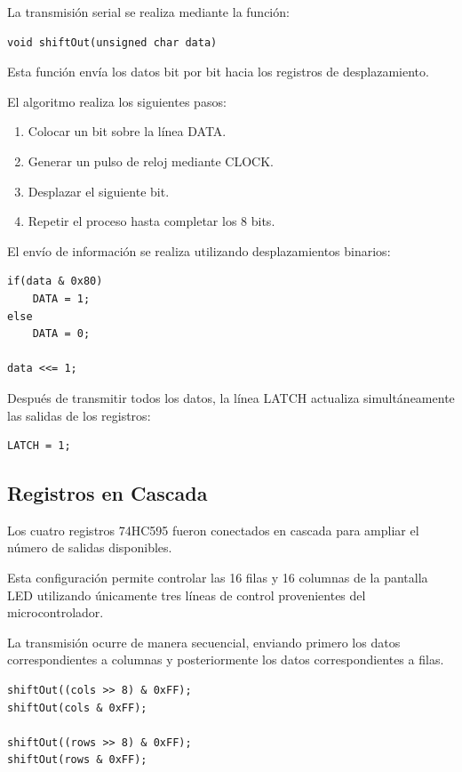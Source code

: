 La transmisión serial se realiza mediante la función:

\begin{verbatim}
void shiftOut(unsigned char data)
\end{verbatim}

Esta función envía los datos bit por bit hacia los registros de desplazamiento.

El algoritmo realiza los siguientes pasos:

\begin{enumerate}
    \item Colocar un bit sobre la línea DATA.
    \item Generar un pulso de reloj mediante CLOCK.
    \item Desplazar el siguiente bit.
    \item Repetir el proceso hasta completar los 8 bits.
\end{enumerate}

El envío de información se realiza utilizando desplazamientos binarios:

\begin{verbatim}
if(data & 0x80)
    DATA = 1;
else
    DATA = 0;

data <<= 1;
\end{verbatim}

Después de transmitir todos los datos, la línea LATCH actualiza simultáneamente las salidas de los registros:

\begin{verbatim}
LATCH = 1;
\end{verbatim}

\subsection{Registros en Cascada}

Los cuatro registros 74HC595 fueron conectados en cascada para ampliar el número de salidas disponibles.

Esta configuración permite controlar las 16 filas y 16 columnas de la pantalla LED utilizando únicamente tres líneas de control provenientes del microcontrolador.

La transmisión ocurre de manera secuencial, enviando primero los datos correspondientes a columnas y posteriormente los datos correspondientes a filas.

\begin{verbatim}
shiftOut((cols >> 8) & 0xFF);
shiftOut(cols & 0xFF);

shiftOut((rows >> 8) & 0xFF);
shiftOut(rows & 0xFF);
\end{verbatim}

